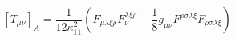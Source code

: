\begin{equation}
\left[T_{\mu\nu}\right]_A =\frac{1}{12\kappa_{11}^2}\left( F_{\mu
\lambda\xi\rho}F_\nu^{\lambda\xi\rho}-\frac{1}{8}g_{\mu\nu}F^{\rho\sigma\lambda\xi}F_{\rho\sigma\lambda\xi}\right)
\end{equation}

